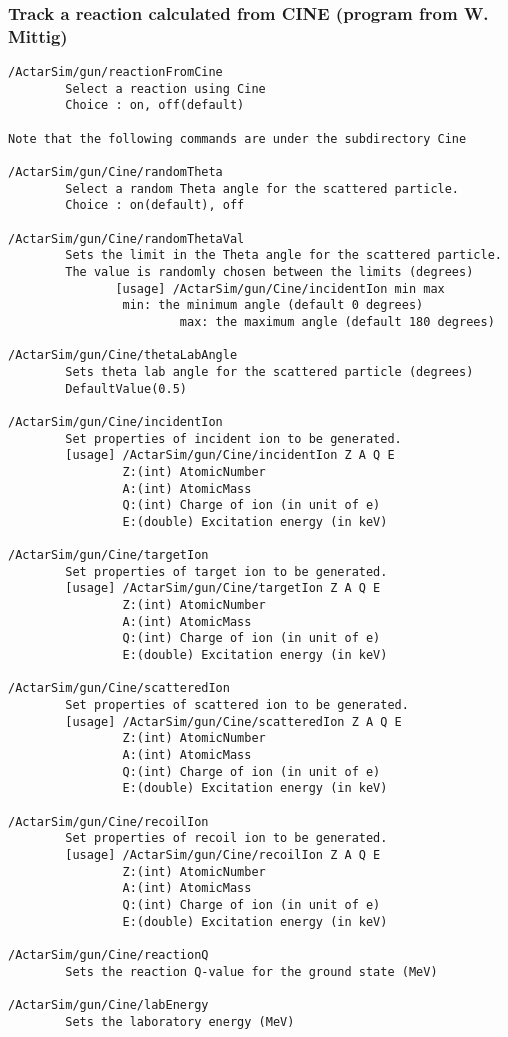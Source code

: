 \subsubsection{Track a reaction calculated from CINE (program from W. Mittig)}
\begin{verbatim}
/ActarSim/gun/reactionFromCine
        Select a reaction using Cine
        Choice : on, off(default)

Note that the following commands are under the subdirectory Cine

/ActarSim/gun/Cine/randomTheta
        Select a random Theta angle for the scattered particle.
        Choice : on(default), off

/ActarSim/gun/Cine/randomThetaVal
        Sets the limit in the Theta angle for the scattered particle.
        The value is randomly chosen between the limits (degrees)
               [usage] /ActarSim/gun/Cine/incidentIon min max 
                min: the minimum angle (default 0 degrees)
                        max: the maximum angle (default 180 degrees)

/ActarSim/gun/Cine/thetaLabAngle        
        Sets theta lab angle for the scattered particle (degrees)
        DefaultValue(0.5)

/ActarSim/gun/Cine/incidentIon
        Set properties of incident ion to be generated.
        [usage] /ActarSim/gun/Cine/incidentIon Z A Q E
                Z:(int) AtomicNumber
                A:(int) AtomicMass
                Q:(int) Charge of ion (in unit of e)
                E:(double) Excitation energy (in keV)

/ActarSim/gun/Cine/targetIon
        Set properties of target ion to be generated.
        [usage] /ActarSim/gun/Cine/targetIon Z A Q E
                Z:(int) AtomicNumber
                A:(int) AtomicMass
                Q:(int) Charge of ion (in unit of e)
                E:(double) Excitation energy (in keV)

/ActarSim/gun/Cine/scatteredIon
        Set properties of scattered ion to be generated.
        [usage] /ActarSim/gun/Cine/scatteredIon Z A Q E
                Z:(int) AtomicNumber
                A:(int) AtomicMass
                Q:(int) Charge of ion (in unit of e)
                E:(double) Excitation energy (in keV)

/ActarSim/gun/Cine/recoilIon
        Set properties of recoil ion to be generated.
        [usage] /ActarSim/gun/Cine/recoilIon Z A Q E
                Z:(int) AtomicNumber
                A:(int) AtomicMass
                Q:(int) Charge of ion (in unit of e)
                E:(double) Excitation energy (in keV)

/ActarSim/gun/Cine/reactionQ  
        Sets the reaction Q-value for the ground state (MeV)

/ActarSim/gun/Cine/labEnergy
        Sets the laboratory energy (MeV)
\end{verbatim}

